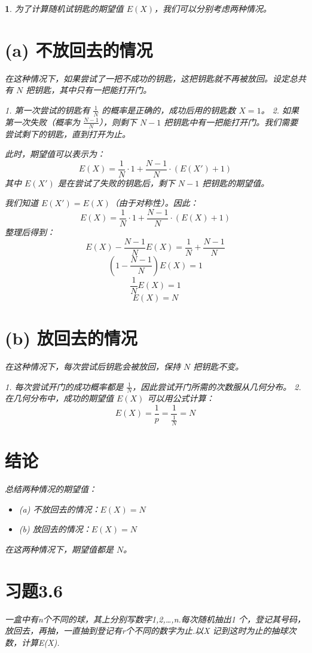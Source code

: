 \documentclass[UTF8]{report}
\theoremstyle{MyLineTheoremStyle} %
\theoremstyle{MyBlockTheoremStyle} %
\theoremstyle{MySubsubsectionStyle} %
\newtheorem{definition}{}
\begin{document}
\begin{definition}
为了计算随机试钥匙的期望值 $E(X)$，我们可以分别考虑两种情况。

\section*{(a) 不放回去的情况}

在这种情况下，如果尝试了一把不成功的钥匙，这把钥匙就不再被放回。设定总共有 $N$ 把钥匙，其中只有一把能打开门。

1. 第一次尝试的钥匙有 $\frac{1}{N}$ 的概率是正确的，成功后用的钥匙数 $X = 1$。
2. 如果第一次失败（概率为 $\frac{N-1}{N}$），则剩下 $N-1$ 把钥匙中有一把能打开门。我们需要尝试剩下的钥匙，直到打开为止。

此时，期望值可以表示为：
\[
E(X) = \frac{1}{N} \cdot 1 + \frac{N-1}{N} \cdot (E(X') + 1)
\]
其中 $E(X')$ 是在尝试了失败的钥匙后，剩下 $N-1$ 把钥匙的期望值。

我们知道 $E(X') = E(X)$（由于对称性）。因此：
\[
E(X) = \frac{1}{N} \cdot 1 + \frac{N-1}{N} \cdot (E(X) + 1)
\]
整理后得到：
\[
E(X) - \frac{N-1}{N} E(X) = \frac{1}{N} + \frac{N-1}{N}
\]
\[
\left(1 - \frac{N-1}{N}\right) E(X) = 1
\]
\[
\frac{1}{N} E(X) = 1
\]
\[
E(X) = N
\]

\section*{(b) 放回去的情况}

在这种情况下，每次尝试后钥匙会被放回，保持 $N$ 把钥匙不变。

1. 每次尝试开门的成功概率都是 $\frac{1}{N}$，因此尝试开门所需的次数服从几何分布。
2. 在几何分布中，成功的期望值 $E(X)$ 可以用公式计算：
\[
E(X) = \frac{1}{p} = \frac{1}{\frac{1}{N}} = N
\]

\section*{结论}

总结两种情况的期望值：
\begin{itemize}
    \item (a) 不放回去的情况：$E(X) = N$
    \item (b) 放回去的情况：$E(X) = N$
\end{itemize}

在这两种情况下，期望值都是 $N$。

\section{习题3.6}
一盒中有n个不同的球，其上分别写数字1,2,…,n.每次随机抽出1 个，登记其号码，放回去，再抽，一直抽到登记有r个不同的数字为止.以X 记到这时为止的抽球次数，计算E(X).


\end{definition}
\end{document}
